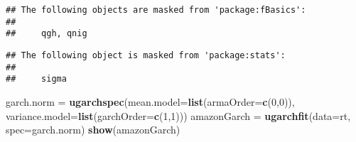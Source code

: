 \documentclass[
]{article}
\newenvironment{Shaded}{\begin{snugshade}}{\end{snugshade}}
\newcommand{\AttributeTok}[1]{\textcolor[rgb]{0.13,0.29,0.53}{#1}}
\newcommand{\DecValTok}[1]{\textcolor[rgb]{0.00,0.00,0.81}{#1}}
\newcommand{\FunctionTok}[1]{\textcolor[rgb]{0.13,0.29,0.53}{\textbf{#1}}}
\newcommand{\NormalTok}[1]{#1}
\newcommand{\OtherTok}[1]{\textcolor[rgb]{0.56,0.35,0.01}{#1}}
\begin{document}
\begin{verbatim}
## The following objects are masked from 'package:fBasics':
## 
##     qgh, qnig
\end{verbatim}

\begin{verbatim}
## The following object is masked from 'package:stats':
## 
##     sigma
\end{verbatim}

\begin{Shaded}
\begin{Highlighting}[]
\NormalTok{garch.norm }\OtherTok{=} \FunctionTok{ugarchspec}\NormalTok{(}\AttributeTok{mean.model=}\FunctionTok{list}\NormalTok{(}\AttributeTok{armaOrder=}\FunctionTok{c}\NormalTok{(}\DecValTok{0}\NormalTok{,}\DecValTok{0}\NormalTok{)),}
\AttributeTok{variance.model=}\FunctionTok{list}\NormalTok{(}\AttributeTok{garchOrder=}\FunctionTok{c}\NormalTok{(}\DecValTok{1}\NormalTok{,}\DecValTok{1}\NormalTok{)))}
\NormalTok{amazonGarch }\OtherTok{=} \FunctionTok{ugarchfit}\NormalTok{(}\AttributeTok{data=}\NormalTok{rt, }\AttributeTok{spec=}\NormalTok{garch.norm)}
\FunctionTok{show}\NormalTok{(amazonGarch)}
\end{Highlighting}
\end{Shaded}
\end{document}
